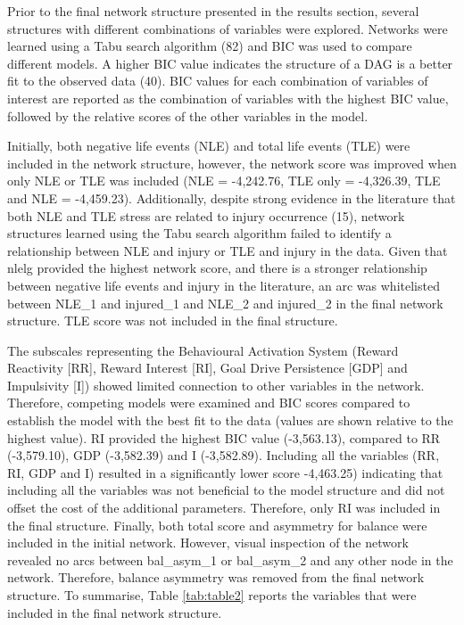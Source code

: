 \documentclass[
  english,
  man]{apa6}
\begin{document}
Prior to the final network structure presented in the results section, several structures with different combinations of variables were explored.
Networks were learned using a Tabu search algorithm (82) and BIC was used to compare different models.
A higher BIC value indicates the structure of a DAG is a better fit to the observed data (40).
BIC values for each combination of variables of interest are reported as the combination of variables with the highest BIC value, followed by the relative scores of the other variables in the model.

Initially, both negative life events (NLE) and total life events (TLE) were included in the network structure, however, the network score was improved when only NLE or TLE was included (NLE = -4,242.76, TLE only = -4,326.39, TLE and NLE = -4,459.23).
Additionally, despite strong evidence in the literature that both NLE and TLE stress are related to injury occurrence (15), network structures learned using the Tabu search algorithm failed to identify a relationship between NLE and injury or TLE and injury in the data.
Given that nlelg provided the highest network score, and there is a stronger relationship between negative life events and injury in the literature, an arc was whitelisted between NLE\_1 and injured\_1 and NLE\_2 and injured\_2 in the final network structure.
TLE score was not included in the final structure.

The subscales representing the Behavioural Activation System (Reward Reactivity {[}RR{]}, Reward Interest {[}RI{]}, Goal Drive Persistence {[}GDP{]} and Impulsivity {[}I{]}) showed limited connection to other variables in the network.
Therefore, competing models were examined and BIC scores compared to establish the model with the best fit to the data (values are shown relative to the highest value).
RI provided the highest BIC value (-3,563.13), compared to RR (-3,579.10), GDP (-3,582.39) and I (-3,582.89).
Including all the variables (RR, RI, GDP and I) resulted in a significantly lower score -4,463.25) indicating that including all the variables was not beneficial to the model structure and did not offset the cost of the additional parameters.
Therefore, only RI was included in the final structure.
Finally, both total score and asymmetry for balance were included in the initial network.
However, visual inspection of the network revealed no arcs between bal\_asym\_1 or bal\_asym\_2 and any other node in the network.
Therefore, balance asymmetry was removed from the final network structure.
To summarise, Table \ref{tab:table2} reports the variables that were included in the final network structure.
\end{document}
